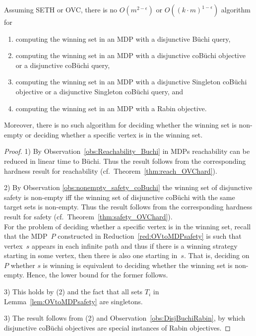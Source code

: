 \documentclass[11pt,letterpaper]{article}
\newcommand{\mdp}{P\xspace}
\newcommand{\target}{T\xspace}
\begin{document}
\begin{proposition}
  Assuming SETH or OVC, there is no $O(m^{2-\epsilon})$ or $O((k\cdot m)^{1-\epsilon})$ algorithm for
  \begin{enumerate}
   \item computing the winning set in an MDP with a disjunctive Büchi query,
   \item computing the winning set in an MDP with a disjunctive coBüchi objective or 
						 a disjunctive coBüchi query,
   \item computing the winning set in an MDP with a disjunctive Singleton coBüchi objective or
   						 a disjunctive Singleton coBüchi query, and
   \item computing the winning set in an MDP with a Rabin objective.
  \end{enumerate}  
  Moreover, there is no such algorithm for deciding whether the winning set is non-empty
  or deciding whether a specific vertex is in the winning set. 
\end{proposition}
\begin{proof}
 1) By Observation~\ref{obs:Reachability_Buchi} in MDPs reachability can be reduced in
 linear time to Büchi. Thus the result follows from
    the corresponding hardness result for reachability (cf.\ Theorem~\ref{thm:reach_OVChard}).
    
 2) By Observation \ref{obs:nonempty_safety_coBuchi} the winning set of disjunctive safety is non-empty iff
    the winning set of disjunctive coBüchi with the same target sets is non-empty. Thus 
    the result follows from the corresponding hardness result for safety (cf.\  Theorem~\ref{thm:safety_OVChard}).\\
    For the problem of deciding whether a specific vertex is in the winning set, recall
    that the MDP~$\mdp$ constructed in Reduction~\ref{red:OVtoMDPsafety} is such that vertex~$s$
    appears in each infinite path and thus if there is a winning strategy starting in some vertex,
    then there is also one starting in~$s$. 
    That is, deciding on $\mdp$ whether $s$ is winning is equivalent to deciding 
    whether the winning
    set is non-empty. Hence, the lower bound for the former follows.  
 
 3) This holds by (2) and the fact that all sets $\target_i$ in Lemma~\ref{lem:OVtoMDPsafety} are singletons.
 
 3) The result follows from (2) and Observation~\ref{obs:DisjBuchiRabin}, by which disjunctive coBüchi objectives are special instances of Rabin objectives.
\end{proof}
\end{document}
